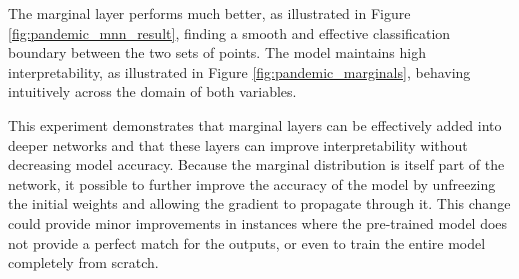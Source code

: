 The marginal layer performs much better, as illustrated in Figure \ref{fig:pandemic_mnn_result}, finding a smooth and effective classification boundary between the two sets of points. The model maintains high interpretability, as illustrated in Figure \ref{fig:pandemic_marginals}, behaving intuitively across the domain of both variables. 

This experiment demonstrates that marginal layers can be effectively added into deeper networks and that these layers can improve interpretability without decreasing model accuracy. Because the marginal distribution is itself part of the network, it  possible to further improve the accuracy of the model by unfreezing the initial weights and allowing the gradient to propagate through it. This change could provide minor improvements in instances where the pre-trained model does not provide a perfect match for the outputs, or even to train the entire model completely from scratch. 